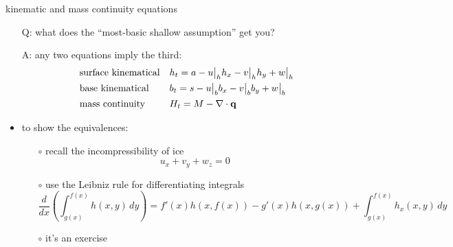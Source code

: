 \begin{frame}{kinematic and mass continuity equations}

\begin{itemize}
\item[Q:] what does the ``most-basic shallow assumption'' get you?
\item[A:] any two equations imply the third:
\small
\begin{align*}
&\text{surface kinematical} && h_t = a - u\big|_h h_x - v\big|_h h_y + w\big|_h  \\
&\text{base kinematical} && b_t = s - u\big|_b b_x - v\big|_b b_y + w\big|_b  \\
&\text{mass continuity} && H_t = M - \nabla\cdot \mathbf{q}
\end{align*}
\normalsize

\bigskip
\item to show the equivalences:
  \begin{itemize}
  \item[$\circ$]  recall the incompressibility of ice
    $$u_x + v_y + w_z = 0$$
  \item[$\circ$]  use the Leibniz rule for differentiating integrals
  {\scriptsize
    $$\frac{d}{dx}\left(\int_{g(x)}^{f(x)} h(x,y)\,dy\right) = f'(x) h(x,f(x)) - g'(x) h(x,g(x)) + \int_{g(x)}^{f(x)} h_x(x,y)\,dy$$}
  \item[$\circ$]  it's an exercise
  \end{itemize}
\end{itemize}
\end{frame}


